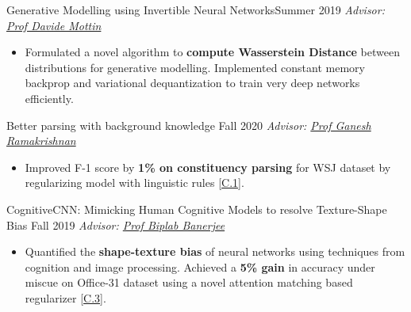 
\begin{projects}

 \vspace{-0.5em}
\project
	{Generative Modelling using Invertible Neural Networks}{Summer 2019}
	{
	    \textit{Advisor: \href{https://mott.in}{Prof Davide Mottin}}
	}
	{\begin{itemize}
	\setlength\itemsep{0.3em}
      \item Formulated a novel algorithm to \textbf{compute Wasserstein Distance} between distributions for generative modelling. Implemented constant memory backprop and variational dequantization to train very deep networks efficiently.
        \end{itemize}
     }

 \vspace{-0.5em}
\project
	{Better parsing with background knowledge}{ Fall 2020}
	{
	    \textit{Advisor: \href{https://www.cse.iitb.ac.in/~ganesh/}{Prof Ganesh Ramakrishnan}}
	}
 {\begin{itemize}
	\setlength\itemsep{0.3em}
      \item Improved F-1 score by \textbf{1\% on constituency parsing} for WSJ dataset by regularizing model with linguistic rules [\hyperref[C1]{C.1}].
        \end{itemize}    }

 \vspace{-0.5em}
\project
	{CognitiveCNN: Mimicking Human Cognitive Models to resolve Texture-Shape Bias}{ Fall 2019}
	{
	    \textit{Advisor: \href{https://biplab-banerjee.github.io}{Prof Biplab Banerjee}}
	}
	{
\begin{itemize}
	\setlength\itemsep{0.3em}
      \item Quantified the \textbf{shape-texture bias} of neural networks using techniques from cognition and image processing. Achieved a \textbf{5\% gain} in accuracy under miscue on Office-31 dataset using a novel attention matching based regularizer [\hyperref[C3]{C.3}].
        \end{itemize}     }

 \vspace{-1.5em}
        
\end{projects}
\vspace{-4mm}
